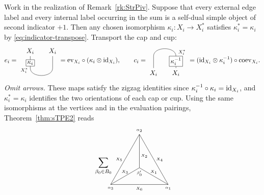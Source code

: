 \documentclass{amsart}
\begin{document}
\begin{remark} \label{rk:simplified}
Work in the realization of Remark~\ref{rk:StrPiv}. Suppose that every external edge label and every internal label occurring in the sum
is a self-dual simple object of second indicator $+1$.
Then any chosen isomorphism $\kappa_i:X_i\to X_i^*$ satisfies
$\kappa_i^*=\kappa_i$ by \eqref{eq:indicator-transpose}. Transport the cap and cup:
\[
 e_i=
\begin{tikzpicture}[baseline=(current bounding box.center),scale=.8]
\draw (0,0) node[above] {$X_i$} -- (0,-.8)
 .. controls (0,-1.45) and (1.5,-1.45) .. (1.5,-.8)
 --(1.5,0) node[above] {$X_i$};
\node[draw,fill=white,inner sep=2pt] at (0,-.45) {$\kappa_i$};
\node[left,font=\scriptsize] at (0,-.95) {$X_i^*$};
\end{tikzpicture}
=\ev_{X_i}\circ(\kappa_i\otimes\id_{X_i}),
\qquad
 c_i=
\begin{tikzpicture}[baseline=(current bounding box.center),scale=.8]
\draw (0,0) node[below] {$X_i$} -- (0,.8)
 .. controls (0,1.45) and (1.5,1.45) .. (1.5,.8)
 --(1.5,0) node[below] {$X_i$};
\node[draw,fill=white,inner sep=2pt] at (1.5,.45) {$\kappa_i^{-1}$};
\node[right,font=\scriptsize] at (1.5,1.05) {$X_i^*$};
\end{tikzpicture}
=(\id_{X_i}\otimes\kappa_i^{-1})\circ\coev_{X_i}.
\]
\emph{Omit arrows.} These maps satisfy the zigzag identities since $\kappa_i^{-1}\circ\kappa_i=\mathrm{id}_{X_i}$,
and $\kappa_i^*=\kappa_i$ identifies the two orientations of each cap or cup.
Using the same isomorphisms at the vertices and in the evaluation pairings,
Theorem~\ref{thm:sTPE2} reads
$$
\sum_{\beta_0 \in B_0} \hspace{-.5cm}
\raisebox{-1.4cm}{
\begin{tikzpicture}[scale=1.43]
\draw (2,0) -- (1,0) node [below] {\tiny ${X_6}$};
\draw (0,0) node [below] {\tiny $\alpha_3$} -- (1,0);
\draw (2,0) node [below] {\tiny $\alpha_1$} -- (1.5,.866) node [right] {\tiny ${X_4}$};
\draw (1.5,.866) -- (1,1.732);
\draw (1,1.732)	node [above] {\tiny $\alpha_2$} -- (.5,.866) node [left] {\tiny ${X_5}$};
\draw (.5,.866) -- (0,0);
\draw (1,0.577) -- (.5,.2885) node [above] {\tiny ${X_3}$};
\draw (0,0) -- (.5,.2885);
\draw (1,0.577) node [below=.015cm] {\tiny $\beta'_0$} -- (1,1.1545);\node[anchor=west,inner sep=2pt] at (1,.99) {\tiny ${X_2}$};
\draw (1,1.732) -- (1,1.1545);
\draw (1,0.577) -- (1.5,.2885) node [above] {\tiny ${X_1}$};
\draw (2,0) -- (1.5,.2885);
\end{tikzpicture}} \hspace{-.2cm}
$$
\end{remark}
\end{document}
